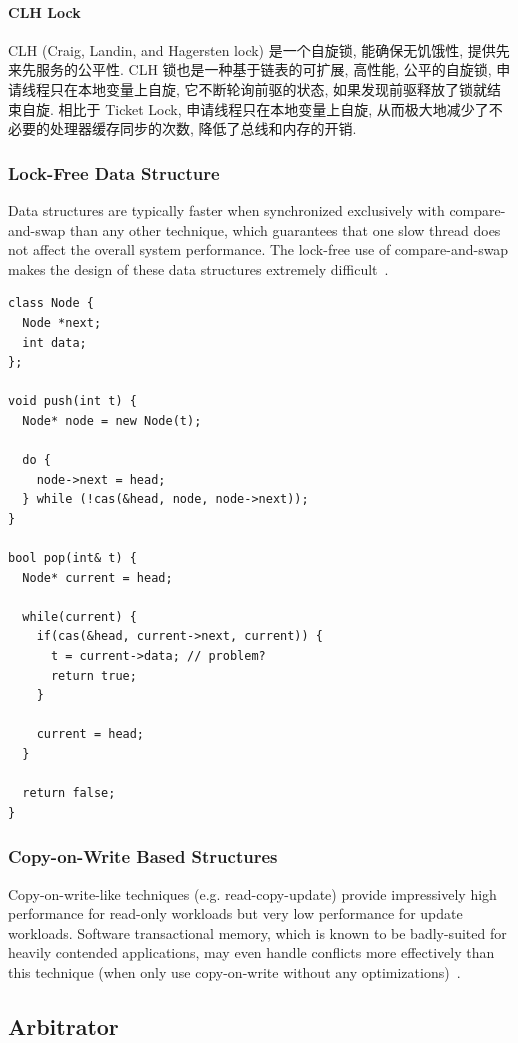 \documentclass[UTF8,12pt,a4paper]{article}
\begin{document}
\paragraph{CLH Lock}
CLH (Craig, Landin, and Hagersten lock) 是一个自旋锁, 能确保无饥饿性, 提供先来先服务的公平性.
CLH 锁也是一种基于链表的可扩展, 高性能, 公平的自旋锁,
申请线程只在本地变量上自旋, 它不断轮询前驱的状态, 如果发现前驱释放了锁就结束自旋.
相比于 Ticket Lock, 申请线程只在本地变量上自旋,
从而极大地减少了不必要的处理器缓存同步的次数, 降低了总线和内存的开销.
\subsubsection{Lock-Free Data Structure}
Data structures are typically faster when synchronized exclusively
with compare-and-swap than any other technique,
which guarantees that one slow thread does not affect the overall system performance.
The lock-free use of compare-and-swap makes
the design of these data structures extremely difficult~\cite{DBLP:conf/ppopp/Gramoli15}.
\begin{lstlisting}
class Node {
  Node *next;
  int data;
}; 

void push(int t) {
  Node* node = new Node(t);

  do {
    node->next = head;
  } while (!cas(&head, node, node->next));
}

bool pop(int& t) {
  Node* current = head;

  while(current) {
    if(cas(&head, current->next, current)) {
      t = current->data; // problem?
      return true;
    }

    current = head;
  }

  return false;
}
\end{lstlisting}
\subsubsection{Copy-on-Write Based Structures}
Copy-on-write-like techniques (e.g. read-copy-update)
provide impressively high performance for read-only workloads
but very low performance for update workloads.
Software transactional memory,
which is known to be badly-suited for heavily contended applications,
may even handle conflicts more effectively than this technique
(when only use copy-on-write without any optimizations)~\cite{DBLP:conf/ppopp/Gramoli15}.

\subsection{Arbitrator} %
\label{sub:arbitrator}
\end{document}

